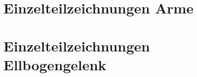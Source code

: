 \section{Einzelteilzeichnungen Arme}
\newpage
\setlength{\voffset}{0cm}
\setlength{\hoffset}{0cm}









%
\newpage
\setlength{\voffset}{-2.5 cm}
\setlength{\hoffset}{-2 cm}
\section{Einzelteilzeichnungen Ellbogengelenk}
\newpage
\setlength{\voffset}{0cm}
\setlength{\hoffset}{0cm}


% 
\setlength{\voffset}{-2.5 cm}
\setlength{\hoffset}{-2 cm}